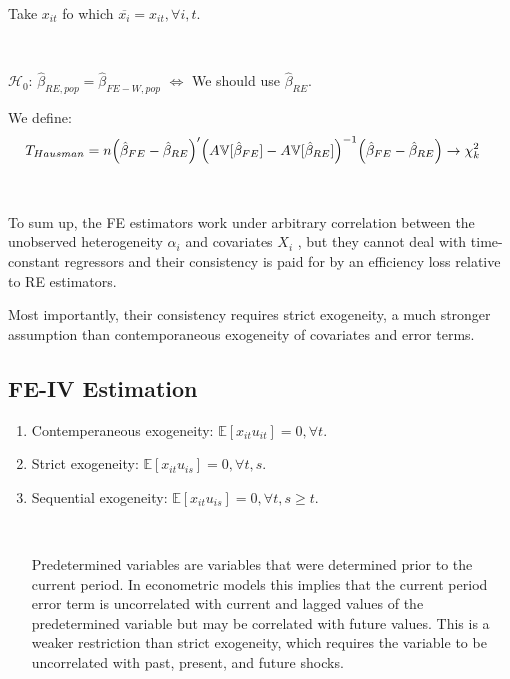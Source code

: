 Take $x_{it} $ fo which $\overline{x_i} = x_{it}, \forall i, t.$

\begin{theorem}\label{Hausman-test}
    \
    
    $\mathcal{H}_0$: $\hat{\beta}_{RE, pop} = \hat{\beta}_{FE-W, pop}$ $\Leftrightarrow$ We should use $\hat{\beta}_{RE}$.

    We define:
    \begin{align*}
        T_{Hausman} &= n \Bigl(\hat{\beta}_{FE} - \hat{\beta}_{RE} \Bigr)^{\prime} \Bigl( A\mathbb{V}[\hat{\beta}_{FE}] - A\mathbb{V}[\hat{\beta}_{RE}] \Bigr)^{-1} \Bigl(\hat{\beta}_{FE} - \hat{\beta}_{RE}\Bigr) \rightarrow \chi_k^2
    \end{align*}
\end{theorem}

\begin{note}
    \

    To sum up, the FE estimators work under arbitrary correlation between the unobserved
heterogeneity $\alpha_i$ and covariates $X_i$ , but they cannot deal with time-constant regressors and
their consistency is paid for by an efficiency loss relative to RE estimators.

    Most importantly, their consistency requires strict exogeneity, 
    a much stronger assumption than contemporaneous exogeneity of covariates and error terms.
\end{note}

\subsection{FE-IV Estimation}

\begin{enumerate}
    \item Contemperaneous exogeneity: $\mathbb{E}[x_{it} u_{it}] = 0, \forall t.$
    \item Strict exogeneity: $\mathbb{E}[x_{it} u_{is}] = 0, \forall t, s.$
    \item Sequential exogeneity: $\mathbb{E}[x_{it} u_{is}] = 0, \forall t, s \geq t.$
    \begin{definition}
        \

        Predetermined variables are variables that were determined prior to the current period. 
        In econometric models this implies that the current period error term is 
        uncorrelated with current and lagged values of the predetermined variable 
        but may be correlated with future values. 
        This is a weaker restriction than strict exogeneity, 
        which requires the variable to be uncorrelated with past, present, and future shocks.
    \end{definition}
\end{enumerate}


